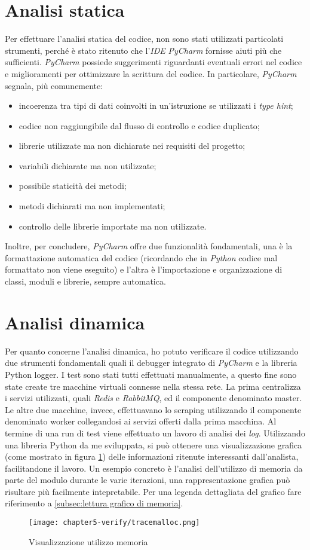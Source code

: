 \section{Analisi statica}
Per effettuare l’analisi statica del codice, non sono stati utilizzati particolati strumenti, perché è stato ritenuto che l’\emph{IDE} \emph{PyCharm} fornisse aiuti più che sufficienti. \emph{PyCharm} possiede suggerimenti riguardanti eventuali errori nel codice e miglioramenti per ottimizzare la scrittura del codice. In particolare, \emph{PyCharm} segnala, più comunemente:
\begin{itemize}
	\item incoerenza tra tipi di dati coinvolti in un’istruzione se utilizzati i \emph{type hint};
	\item codice non raggiungibile dal flusso di controllo e codice duplicato;
	\item librerie utilizzate ma non dichiarate nei requisiti del progetto;
	\item variabili dichiarate ma non utilizzate;
	\item possibile staticità dei metodi;
	\item metodi dichiarati ma non implementati;
	\item controllo delle librerie importate ma non utilizzate.
\end{itemize}
Inoltre, per concludere, \emph{PyCharm} offre due funzionalità fondamentali, una è la formattazione automatica del codice (ricordando che in \emph{Python} codice mal formattato non viene eseguito) e l’altra è l’importazione e organizzazione di classi, moduli e librerie, sempre automatica.

\section{Analisi dinamica}

Per quanto concerne l’analisi dinamica, ho potuto verificare il codice utilizzando due strumenti fondamentali quali il debugger integrato di \emph{PyCharm} e la libreria Python logger. I test sono stati tutti effettuati manualmente, a questo fine sono state create tre macchine virtuali connesse nella stessa rete. La prima centralizza i servizi utilizzati, quali \emph{Redis} e \emph{RabbitMQ}, ed il componente denominato master. Le altre due macchine, invece, effettuavano lo scraping utilizzando il componente denominato worker collegandosi ai servizi offerti dalla prima macchina. \newline{}
Al termine di una run di test viene effettuato un lavoro di analisi dei \emph{log}. Utilizzando una libreria Python da me sviluppata, si può ottenere una visualizzazione grafica (come mostrato in figura \ref{fig:visualizzazione-utilizzo-memoria}) delle informazioni ritenute interessanti dall’analista, facilitandone il lavoro. Un esempio concreto è l’analisi dell’utilizzo di memoria da parte del modulo durante le varie iterazioni, una rappresentazione grafica può risultare più facilmente intepretabile. Per una legenda dettagliata del grafico fare riferimento a \ref{subsec:lettura grafico di memoria}.

\begin{figure}[!h] 
    \centering 
    \texttt{[image: chapter5-verify/tracemalloc.png]} 
    \caption{Visualizzazione utilizzo memoria}
    \label{fig:visualizzazione-utilizzo-memoria} 
\end{figure}




